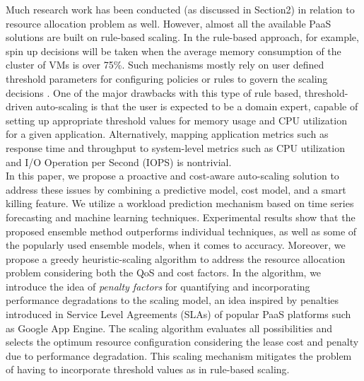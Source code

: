Much research work has been conducted (as discussed in Section2) in relation to resource allocation problem as well. However, almost all the available PaaS solutions are built on rule-based scaling. In the rule-based approach, for example, spin up decisions will be taken when the average memory consumption of the cluster of VMs is over 75\%. Such mechanisms mostly rely on user defined threshold parameters for configuring policies or rules to govern the scaling decisions \cite{modeldriven}. One of the major drawbacks with this type of rule based, threshold-driven auto-scaling is that the user is expected to be a domain expert, capable of setting up appropriate threshold values for memory usage and CPU utilization for a given application. Alternatively, mapping application metrics such as response time and throughput to system-level metrics such as CPU utilization and I/O Operation per Second (IOPS) is nontrivial.\\

In this paper, we propose a proactive and cost-aware auto-scaling solution to address these issues by combining a predictive model, cost model, and a smart killing feature. We utilize a workload prediction mechanism based on time series forecasting and machine learning techniques. Experimental results show that the proposed ensemble method outperforms individual techniques, as well as some of the popularly used ensemble models, when it comes to accuracy. Moreover, we propose a greedy heuristic-scaling algorithm to address the resource allocation problem considering both the QoS and cost factors. In the algorithm, we introduce the idea of \textit{penalty factors} for quantifying and incorporating performance degradations to the scaling model, an idea inspired by penalties introduced in Service Level Agreements (SLAs) of popular PaaS platforms such as Google App Engine. The scaling algorithm evaluates all possibilities and selects the optimum resource configuration considering the lease cost and penalty due to performance degradation. This scaling mechanism mitigates the problem of having to incorporate threshold values as in rule-based scaling.\\

